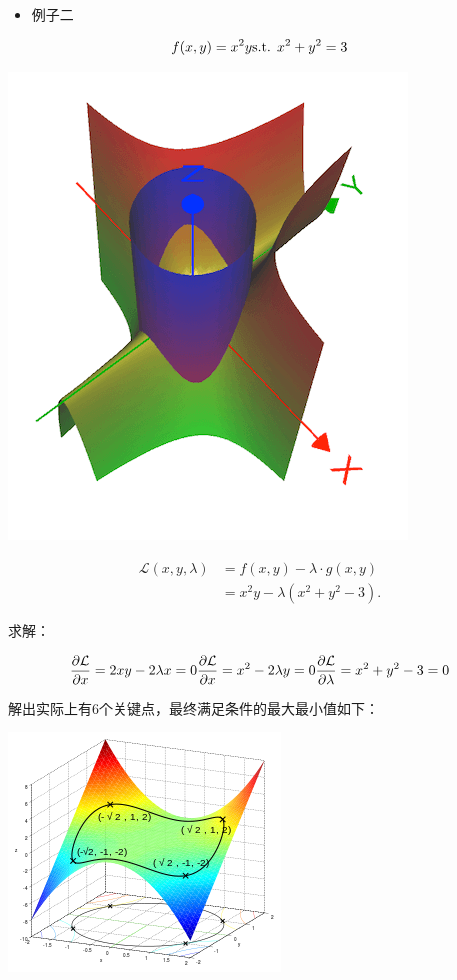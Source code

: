 \documentclass[
]{book}
\providecommand{\tightlist}{%
  \setlength{\itemsep}{0pt}\setlength{\parskip}{0pt}}
\begin{document}
\begin{itemize}
\tightlist
\item
  例子二
\end{itemize}

\[
f(x,y) = x^2 y \\
\text{s.t. }  x^2 + y^2 = 3  \\
\]

\includegraphics{images/lagrange_02.png}

\[{\displaystyle {\begin{aligned}{\mathcal {L}}(x,y,\lambda )&=f(x,y) - \lambda \cdot g(x,y)\\[4pt]&=x^2y - \lambda (x^{2}+y^{2}-3).\end{aligned}}}\]

求解：

\[
\frac{\partial \mathcal{L}}{\partial x} = 2xy - 2 \lambda x = 0 \\
\frac{\partial \mathcal{L}}{\partial x} = x^2 - 2 \lambda y = 0 \\
\frac{\partial \mathcal{L}}{\partial \lambda} = x^2 + y^2 - 3 = 0
\]

解出实际上有6个关键点，最终满足条件的最大最小值如下：

\includegraphics{images/273px-Lagrange_simple.png}
\end{document}
